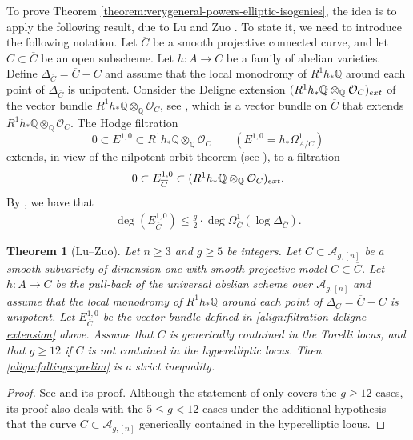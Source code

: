 \documentclass[a4paper,11pt,reqno]{amsart}
\numberwithin{equation}{section}
\newtheorem{theorem}{Theorem}[section]
\theoremstyle{plain}
\theoremstyle{definition}
\newcommand{\Q}{\mathbb Q}
\newcommand{\OO}{\mathcal O}
\newcommand{\ol}[1]{{\overline{#1}}}
\let\rm\relax
\newcommand{\rm}[1]{{\mathrm{#1}}}
\newcommand{\ca}[1]{{\mathcal{#1}}}
\begin{document}
To prove Theorem \ref{theorem:verygeneral-powers-elliptic-isogenies}, the idea is to apply the following result, due to Lu and Zuo \cite{luzuo-shimuracurves}. To state it, we need to introduce the following notation. Let $\ol C$ be a smooth projective connected curve, and let $C \subset \ol C$ be an open subscheme.  
Let $h \colon A \to C$ be a family of abelian varieties. 
Define $\Delta_{\ol C} = \ol C - C$ and assume that the local monodromy of $R^1h_\ast \Q$ around each point of $\Delta_{\ol C}$ is unipotent. Consider the Deligne extension $(R^1h_\ast \Q \otimes_{\Q} \OO_C)_{\rm{ext}}$ of the vector bundle $R^1h_\ast \Q \otimes_{\Q} \OO_C$, see \cite[Proposition 5.2, page 91]{MR417174}, 
which is a vector bundle on $\ol C$ that extends $R^1h_\ast \Q \otimes_{\Q} \OO_C$. The Hodge filtration
\[
0 \subset E^{1,0} \subset 
R^1h_\ast \Q \otimes_{\Q} \OO_C \quad \quad (E^{1,0} = h_\ast \Omega^1_{A/C})
\]
extends, in view of the nilpotent orbit theorem (see \cite[Theorem 2.1]{cattani-kaplan-degenerating}), to a filtration
\begin{align} \label{align:filtration-deligne-extension}
0 \subset E_{\ol C}^{1,0} \subset (R^1h_\ast \Q \otimes_{\Q} \OO_C)_{\rm{ext}}.
\end{align}
    By \cite{faltings-arakelov}, we have that 
\begin{align}\label{align:faltings:prelim}
\deg(E^{1,0}_{\ol C}) \leq \frac{g}{2} \cdot \deg \Omega^1_{\ol C}(\log \Delta_{\ol C}).
\end{align} 

\begin{theorem}[Lu--Zuo] \label{theorem:luzuo}
    Let $n \geq 3$ and $g \geq 5$ be integers. Let $C \subset \ca A_{g,[n]}$ be a smooth subvariety of dimension one with smooth projective model $C \subset \ol C$. Let $h \colon A \to C$ be the pull-back of the universal abelian scheme over $\ca A_{g,[n]}$ and assume that the local monodromy of $R^1h_\ast \Q$ around each point of $\Delta_{\ol C} = \ol C - C$ is unipotent. Let $E^{1,0}_{\ol C}$ be the vector bundle defined in \eqref{align:filtration-deligne-extension} above. Assume that $C$ is generically contained in the Torelli locus, and that $g \geq 12$ if $C$ is not contained in the hyperelliptic locus. Then \eqref{align:faltings:prelim} is a strict inequality.     
\end{theorem}
\begin{proof}
    See \cite[Theorem 1.4]{luzuo-shimuracurves} and its proof. Although the statement of \cite[Theorem 1.4]{luzuo-shimuracurves} only covers the $g \geq 12$ cases, its proof also deals with the $5 \leq g < 12$ cases under the additional hypothesis that the curve $C \subset \ca A_{g,[n]}$ generically contained in the hyperelliptic locus. 
\end{proof}
 
\end{document}
